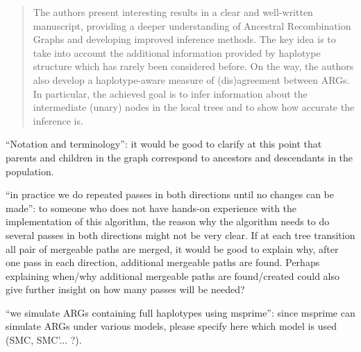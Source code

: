 
\begin{quote}
The authors present interesting results in a clear and well-written manuscript, providing a deeper understanding of Ancestral Recombination Graphs and developing improved inference methods. The key idea is to take into account the additional information provided by haplotype structure which has rarely been considered before. On the way, the authors also develop a haplotype-aware measure of (dis)agreement between ARGs. In particular, the achieved goal is to infer information about the intermediate (unary) nodes in the local trees and to show how accurate the inference is.
\end{quote}

\begin{point}{\revref} %
 ``Notation and terminology'': it would be good to clarify at this point that parents and children in the graph correspond to ancestors and descendants in the population.
\end{point}


\begin{point}{\revref} %
 ``in practice we do repeated passes in both directions until no changes can be made'': to someone who does not have hands-on experience with the implementation of this algorithm, the reason why the algorithm needs to do several passes in both directions might not be very clear. If at each tree transition all pair of mergeable paths are merged, it would be good to explain why, after one pass in each direction, additional mergeable paths are found. Perhaps explaining when/why additional mergeable paths are found/created could also give further insight on how many passes will be needed?
\end{point}


\begin{point}{\revref} %
 ``we simulate ARGs containing full haplotypes using msprime'': since msprime can simulate ARGs under various models, please specify here which model is used (SMC, SMC'... ?).
\end{point}

